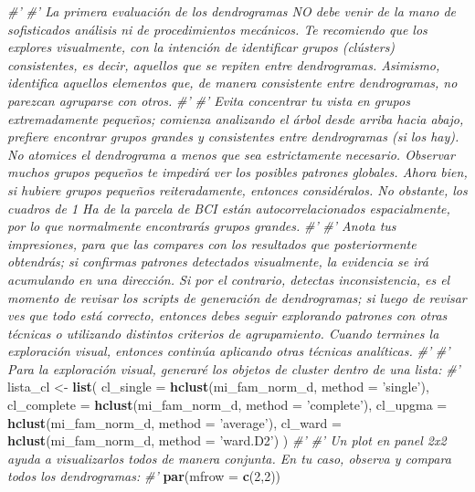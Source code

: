 \documentclass[11pt,]{article}
\newenvironment{Shaded}{\begin{snugshade}}{\end{snugshade}}
\newcommand{\KeywordTok}[1]{\textcolor[rgb]{0.13,0.29,0.53}{\textbf{#1}}}
\newcommand{\DataTypeTok}[1]{\textcolor[rgb]{0.13,0.29,0.53}{#1}}
\newcommand{\DecValTok}[1]{\textcolor[rgb]{0.00,0.00,0.81}{#1}}
\newcommand{\StringTok}[1]{\textcolor[rgb]{0.31,0.60,0.02}{#1}}
\newcommand{\CommentTok}[1]{\textcolor[rgb]{0.56,0.35,0.01}{\textit{#1}}}
\newcommand{\NormalTok}[1]{#1}
\begin{document}
\begin{Shaded}
\begin{Highlighting}[]
{{{\CommentTok{#' }
\CommentTok{#' La primera evaluación de los dendrogramas NO debe venir de la mano de sofisticados análisis ni de procedimientos mecánicos. Te recomiendo que los explores visualmente, con la intención de identificar grupos (clústers) consistentes, es decir, aquellos que se repiten entre dendrogramas. Asimismo, identifica aquellos elementos que, de manera consistente entre dendrogramas, no parezcan agruparse con otros.}
\CommentTok{#' }
\CommentTok{#' Evita concentrar tu vista en grupos extremadamente pequeños; comienza analizando el árbol desde arriba hacia abajo, prefiere encontrar grupos grandes y consistentes entre dendrogramas (si los hay). No atomices el dendrograma a menos que sea estrictamente necesario. Observar muchos grupos pequeños te impedirá ver los posibles patrones globales. Ahora bien, si hubiere grupos pequeños reiteradamente, entonces considéralos. No obstante, los cuadros de 1 Ha de la parcela de BCI están autocorrelacionados espacialmente, por lo que normalmente encontrarás grupos grandes.}
\CommentTok{#' }
\CommentTok{#' Anota tus impresiones, para que las compares con los resultados que posteriormente obtendrás; si confirmas patrones detectados visualmente, la evidencia se irá acumulando en una dirección. Si por el contrario, detectas inconsistencia, es el momento de revisar los scripts de generación de dendrogramas; si luego de revisar ves que todo está correcto, entonces debes seguir explorando patrones con otras técnicas o utilizando distintos criterios de agrupamiento. Cuando termines la exploración visual, entonces continúa aplicando otras técnicas analíticas.}
\CommentTok{#'}
\CommentTok{#' Para la exploración visual, generaré los objetos de cluster dentro de una lista:}
\CommentTok{#' }
\NormalTok{lista_cl <-}\StringTok{ }\KeywordTok{list}\NormalTok{(}
  \DataTypeTok{cl_single =} \KeywordTok{hclust}\NormalTok{(mi_fam_norm_d, }\DataTypeTok{method =} \StringTok{'single'}\NormalTok{),}
  \DataTypeTok{cl_complete =} \KeywordTok{hclust}\NormalTok{(mi_fam_norm_d, }\DataTypeTok{method =} \StringTok{'complete'}\NormalTok{),}
  \DataTypeTok{cl_upgma =} \KeywordTok{hclust}\NormalTok{(mi_fam_norm_d, }\DataTypeTok{method =} \StringTok{'average'}\NormalTok{),}
  \DataTypeTok{cl_ward =} \KeywordTok{hclust}\NormalTok{(mi_fam_norm_d, }\DataTypeTok{method =} \StringTok{'ward.D2'}\NormalTok{)}
\NormalTok{)}
\CommentTok{#' }
\CommentTok{#' Un plot en panel 2x2 ayuda a visualizarlos todos de manera conjunta. En tu caso, observa y compara todos los dendrogramas:}
\CommentTok{#' }
\KeywordTok{par}\NormalTok{(}\DataTypeTok{mfrow =} \KeywordTok{c}\NormalTok{(}\DecValTok{2}\NormalTok{,}\DecValTok{2}\NormalTok{))}
}}}
\end{Highlighting}
\end{Shaded}
\end{document}
